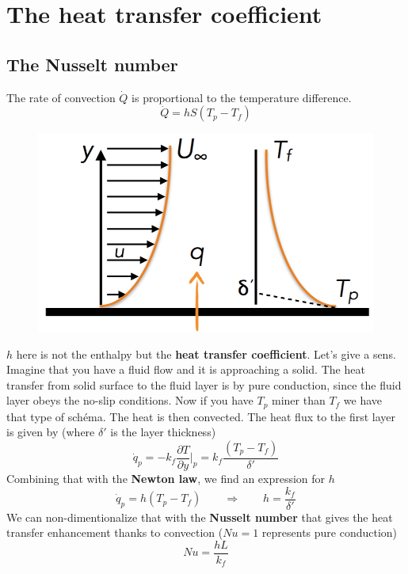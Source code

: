 \section{The heat transfer coefficient}
	\subsection{The Nusselt number}
	The rate of convection $\dot{Q}$ is proportional to the temperature difference. 
	\begin{equation}
		\dot{Q} = h S(T_p - T_f)
	\end{equation}		
	\begin{figure}
	\vspace{-15mm}
	\includegraphics[scale=0.25]{ch5/3}
	\end{figure}	
	$h$ here is not the enthalpy but the \textbf{heat transfer coefficient}. Let’s give a sens. Imagine that you have a fluid flow and it is approaching a solid. The heat transfer from solid surface to the fluid layer is by pure conduction, since the fluid layer obeys the no-slip conditions. Now if you have $T_p$ miner than $T_f$ we have that type of schéma. The heat is then convected. The heat flux to the first layer is given by (where $\delta '$ is the layer thickness)
	\begin{equation}
		\dot{q}_p = -k_f \frac{\partial T}{\partial y}|_p = k_f\frac{(T_p-T_f)}{\delta '}
	\end{equation}
	Combining that with the \textbf{Newton law}, we find an expression for $h$
	\begin{equation}
		\dot{q}_p = h(T_p-T_f) \qquad \Rightarrow \qquad h = \frac{k_f}{\delta '}
	\end{equation}
 	We can non-dimentionalize that with the \textbf{Nusselt number} that gives the heat transfer enhancement thanks to convection ($Nu = 1$ represents pure conduction)
 	\begin{equation}
 		Nu = \frac{hL}{k_f}
 	\end{equation}
	
